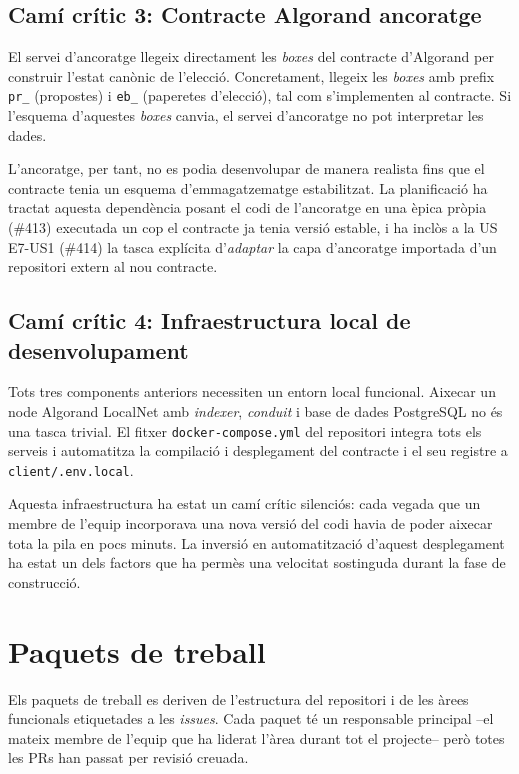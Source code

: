 \subsection{Camí crític 3: Contracte Algorand \textrightarrow{} ancoratge}

El servei d'ancoratge llegeix directament les \emph{boxes} del contracte
d'Algorand per construir l'estat canònic de l'elecció. Concretament, llegeix
les \emph{boxes} amb prefix \texttt{pr\_} (propostes) i \texttt{eb\_}
(paperetes d'elecció), tal com s'implementen al contracte. Si l'esquema
d'aquestes \emph{boxes} canvia, el servei d'ancoratge no pot interpretar
les dades.

L'ancoratge, per tant, no es podia desenvolupar de manera realista fins que
el contracte tenia un esquema d'emmagatzematge estabilitzat. La planificació
ha tractat aquesta dependència posant el codi de l'ancoratge en una èpica
pròpia (\#413) executada un cop el contracte ja tenia versió estable, i ha
inclòs a la \ac{US} E7-US1 (\#414) la tasca explícita d'\emph{adaptar} la
capa d'ancoratge importada d'un repositori extern al nou contracte.

\subsection{Camí crític 4: Infraestructura local de desenvolupament}

Tots tres components anteriors necessiten un entorn local funcional. Aixecar
un node Algorand LocalNet amb \emph{indexer}, \emph{conduit} i base de
dades PostgreSQL no és una tasca trivial. El fitxer
\texttt{docker-compose.yml} del repositori integra tots els
serveis i automatitza la compilació i desplegament del contracte i el seu
registre a \texttt{client/.env.local}.

Aquesta infraestructura ha estat un camí crític silenciós: cada vegada que
un membre de l'equip incorporava una nova versió del codi havia de poder
aixecar tota la pila en pocs minuts. La inversió en automatització
d'aquest desplegament ha estat un dels factors que ha permès una velocitat
sostinguda durant la fase de construcció.

\section{Paquets de treball}
\label{sec:paquets-treball}

Els paquets de treball es deriven de l'estructura del repositori i de les
àrees funcionals etiquetades a les \emph{issues}. Cada paquet té un
responsable principal --el mateix membre de l'equip que ha liderat l'àrea
durant tot el projecte-- però totes les \acsp{PR} han passat per revisió
creuada.

